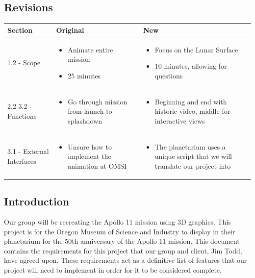 \documentclass[onecolumn, draftclsnofoot,10pt, compsoc]{IEEEtran}
\begin{document}
\subsection*{Revisions}
\begin{tabular} {|p{3.25cm}|p{5cm}|p{7cm}|}
\hline
Section & Original & New \\ \hline
1.2 - Scope & \begin{itemize}
  \item Animate entire mission
  \item 25 minutes
\end{itemize} & \begin{itemize}
  \item Focus on the Lunar Surface
  \item 10 minutes, allowing for questions
\end{itemize}\\ \hline
2.2 3.2 - Functions & \begin{itemize}
  \item Go through mission from launch to splashdown
\end{itemize} & \begin{itemize}
  \item Beginning and end with historic video, middle for interactive views
\end{itemize}\\ \hline
3.1 - External Interfaces & \begin{itemize}
  \item Unsure how to implement the animation at OMSI
\end{itemize} & \begin{itemize}
  \item The planetarium uses a unique script that we will translate our project into
\end{itemize}\\ \hline

\end{tabular}


\clearpage

\subsection{Introduction}
Our group will be recreating the Apollo 11 mission using 3D graphics. This project is for the Oregon Museum of Science and Industry to display in their planetarium for the 50th anniversary of the Apollo 11 mission. This document contains the requirements for this project that our group and client, Jim Todd, have agreed upon. These requirements act as a definitive list of features that our project will need to implement in order for it to be considered complete. 
\end{document}
